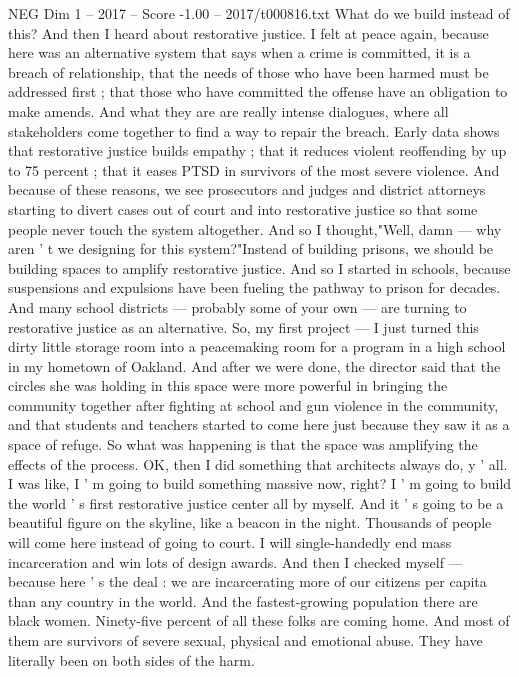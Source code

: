 \begin{textsample}{NEG Dim 1 – 2017 – Score -1.00 – 2017/t000816.txt}
What do we build instead of this?
And then I heard about restorative justice.
I felt at peace again, because here was an alternative system that says when a crime is committed, it is a breach of relationship, that the needs of those who have been harmed must be addressed first ; that those who have committed the offense have an obligation to make amends.
And what they are are really intense dialogues, where all stakeholders come together to find a way to repair the breach.
Early data shows that restorative justice builds empathy ; that it reduces violent reoffending by up to 75 percent ; that it eases PTSD in survivors of the most severe violence.
And because of these reasons, we see prosecutors and judges and district attorneys starting to divert cases out of court and into restorative justice so that some people never touch the system altogether.
And so I thought,"Well, damn — why aren ' t we designing for this system?"Instead of building prisons, we should be building spaces to amplify restorative justice.
And so I started in schools, because suspensions and expulsions have been fueling the pathway to prison for decades.
And many school districts — probably some of your own — are turning to restorative justice as an alternative.
So, my first project — I just turned this dirty little storage room into a peacemaking room for a program in a high school in my hometown of Oakland.
And after we were done, the director said that the circles she was holding in this space were more powerful in bringing the community together after fighting at school and gun violence in the community, and that students and teachers started to come here just because they saw it as a space of refuge.
So what was happening is that the space was amplifying the effects of the process.
OK, then I did something that architects always do, y ' all.
I was like, I ' m going to build something massive now, right?
I ' m going to build the world ' s first restorative justice center all by myself.
And it ' s going to be a beautiful figure on the skyline, like a beacon in the night.
Thousands of people will come here instead of going to court.
I will single-handedly end mass incarceration and win lots of design awards.
And then I checked myself — because here ' s the deal : we are incarcerating more of our citizens per capita than any country in the world.
And the fastest-growing population there are black women.
Ninety-five percent of all these folks are coming home.
And most of them are survivors of severe sexual, physical and emotional abuse.
They have literally been on both sides of the harm.

\end{textsample}
